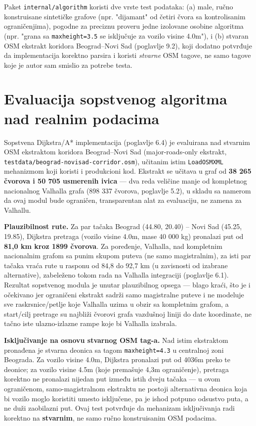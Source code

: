 \setlength{\tabcolsep}{6pt}

Paket \texttt{internal/algorithm} koristi dve vrste test podataka: (a) male, ručno konstruisane sintetičke grafove (npr. "dijamant" od četiri čvora sa kontrolisanim ograničenjima), pogodne za preciznu proveru jedne izolovane osobine algoritma (npr. "grana sa \texttt{maxheight=3.5} se isključuje za vozilo visine 4.0m"), i (b) stvaran OSM ekstrakt koridora Beograd–Novi Sad (poglavlje 9.2), koji dodatno potvrđuje da implementacija korektno parsira i koristi \emph{stvarne} OSM tagove, ne samo tagove koje je autor sam smislio za potrebe testa.

\section{Evaluacija sopstvenog algoritma nad realnim podacima}

Sopstvena Dijkstra/A* implementacija (poglavlje 6.4) je evaluirana nad stvarnim OSM ekstraktom koridora Beograd–Novi Sad (major-roads-only ekstrakt, \newline \texttt{testdata/beograd-novisad-corridor.osm}), učitanim istim \texttt{LoadOSMXML} mehanizmom koji koristi i produkcioni kod. Ekstrakt se učitava u graf od \textbf{38 265 čvorova i 50 705 usmerenih ivica} — dva reda veličine manje od kompletnog nacionalnog Valhalla grafa (898 337 čvorova, poglavlje 5.2), u skladu sa namerom da ovaj modul bude ograničen, transparentan alat za evaluaciju, ne zamena za Valhallu.

\textbf{Plauzibilnost rute.} Za par tačaka Beograd (44.80, 20.40) – Novi Sad (45.25, 19.85), Dijkstra pretraga (vozilo visine 4.0m, mase 40 000 kg) pronalazi put od \textbf{81,0 km kroz 1899 čvorova}. Za poređenje, Valhalla, nad kompletnim nacionalnim grafom sa punim skupom puteva (ne samo magistralnim), za isti par tačaka vraća rute u rasponu od 84,8 do 92,7 km (u zavisnosti od izabrane alternative), zabeleženo tokom rada na Valhalla integraciji (poglavlje 6.1). Rezultat sopstvenog modula je unutar plauzibilnog opsega — blago kraći, što je i očekivano jer ograničeni ekstrakt sadrži samo magistralne puteve i ne modeluje sve raskrsnice/petlje koje Valhalla uzima u obzir sa kompletnim grafom, a start/cilj pretrage su najbliži čvorovi grafa vazdušnoj liniji do date koordinate, ne tačno iste ulazno-izlazne rampe koje bi Valhalla izabrala.

\textbf{Isključivanje na osnovu stvarnog OSM tag-a.} Nad istim ekstraktom pronađena je stvarna deonica sa tagom \texttt{maxheight=4.3} u centralnoj zoni Beograda. Za vozilo visine 4.0m, Dijkstra pronalazi put od 4036m preko te deonice; za vozilo visine 4.5m (koje premašuje 4,3m ograničenje), pretraga korektno ne pronalazi nijedan put između istih dveju tačaka — u ovom ograničenom, samo-magistralnom ekstraktu ne postoji alternativna deonica koja bi vozilo moglo koristiti umesto isključene, pa je ishod potpuno odsustvo puta, a ne duži zaobilazni put. Ovaj test potvrđuje da mehanizam isključivanja radi korektno na \textbf{stvarnim}, ne samo ručno konstruisanim OSM podacima.

